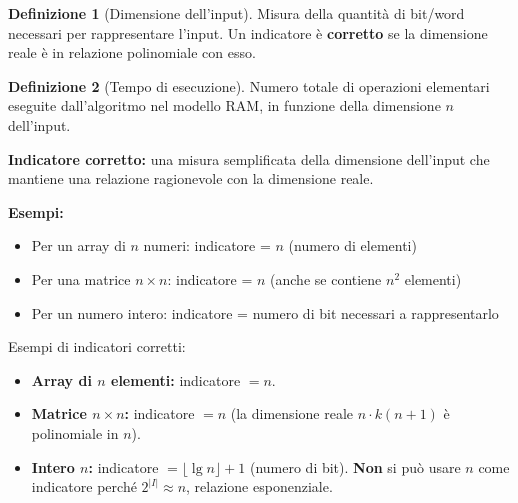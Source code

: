 \documentclass[a4paper, 11pt]{article}
\theoremstyle{definition}
\newtheorem{definizione}{Definizione}[section]
\theoremstyle{remark}
\theoremstyle{remark}
\newenvironment{nota}{%
	\begin{tcolorbox}[
		colback=codebg,
		colframe=primary,
		fonttitle=\bfseries,
		title=Nota,
		left=6pt, right=6pt, top=4pt, bottom=4pt
		]
	}{%
	\end{tcolorbox}
}
\begin{document}
	\begin{definizione}[Dimensione dell'input]
		Misura della quantità di bit/word necessari per rappresentare
		l'input. Un indicatore è \textbf{corretto} se la dimensione
		reale è in relazione polinomiale con esso.
	\end{definizione}
	
	\begin{definizione}[Tempo di esecuzione]
		Numero totale di operazioni elementari eseguite dall'algoritmo
		nel modello RAM, in funzione della dimensione $n$ dell'input.
	\end{definizione}
	
	\begin{nota}
		\textbf{Indicatore corretto:} una misura semplificata della dimensione dell'input che mantiene una relazione ragionevole con la dimensione reale.
		
		\textbf{Esempi:}
		\begin{itemize}
			\item Per un array di $n$ numeri: indicatore = $n$ (numero di elementi)
			\item Per una matrice $n \times n$: indicatore = $n$ (anche se contiene $n^2$ elementi)
			\item Per un numero intero: indicatore = numero di bit necessari a rappresentarlo
		\end{itemize}
	\end{nota}
	
	Esempi di indicatori corretti:
	\begin{itemize}
		\item \textbf{Array di $n$ elementi:} indicatore $= n$. \checkmark
		\item \textbf{Matrice $n \times n$:} indicatore $= n$
		(la dimensione reale $n \cdot k(n+1)$ è polinomiale in $n$).
		\checkmark
		\item \textbf{Intero $n$:} indicatore $= \lfloor \lg n \rfloor + 1$
		(numero di bit). \textbf{Non} si può usare $n$ come
		indicatore perché $2^{|I|} \approx n$, relazione
		esponenziale. \checkmark
	\end{itemize}
	
\end{document}
